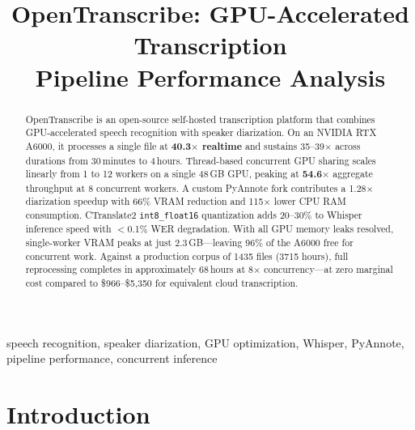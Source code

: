 \documentclass[conference,10pt]{IEEEtran}
\begin{document}
\title{OpenTranscribe: GPU-Accelerated Transcription\\Pipeline Performance Analysis}

\author{
}

\maketitle

\begin{abstract}
OpenTranscribe is an open-source self-hosted transcription platform that
combines GPU-accelerated speech recognition with speaker diarization. On an
NVIDIA RTX A6000, it processes a single file at \textbf{40.3$\times$ realtime}
and sustains 35--39$\times$ across durations from 30\,minutes to 4\,hours.
Thread-based concurrent GPU sharing scales linearly from 1 to 12 workers on a
single 48\,GB GPU, peaking at \textbf{54.6$\times$} aggregate throughput at
8 concurrent workers. A custom PyAnnote fork contributes a 1.28$\times$
diarization speedup with 66\% VRAM reduction and 115$\times$ lower CPU RAM
consumption. CTranslate2 \texttt{int8\_float16} quantization adds 20--30\%
to Whisper inference speed with $<$0.1\% WER degradation. With all GPU memory
leaks resolved, single-worker VRAM peaks at just 2.3\,GB---leaving 96\% of
the A6000 free for concurrent work. Against a production corpus of \num{1435}
files (\num{3715} hours), full reprocessing completes in approximately
68\,hours at 8$\times$ concurrency---at zero marginal cost compared to
\$966--\$5,350 for equivalent cloud transcription.
\end{abstract}

\begin{IEEEkeywords}
speech recognition, speaker diarization, GPU optimization, Whisper, PyAnnote,
pipeline performance, concurrent inference
\end{IEEEkeywords}

\section{Introduction}
\end{document}
